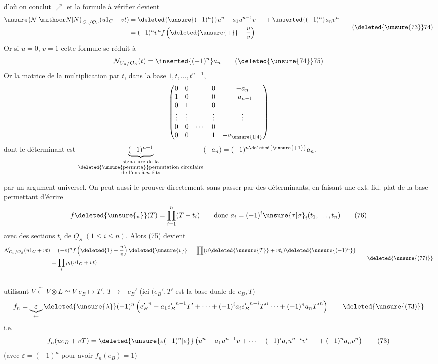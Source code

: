 d'où on conclut  $\nearrow$
et la formule à vérifier devient
\[
\begin{aligned}
\unsure{\mathcal N|\mathscr N|N}_{C_n/\mathcal O_S}(u1_C+vt)&=\deleted{\unsure{(-1)^n}}u^n-a_1u^{n-1}v\,\text{---}\,+\inserted{(-1)^n}a_nv^n\\
&=(-1)^nv^nf\left(\deleted{\unsure{+}}-\frac{u}{v}\right)
\end{aligned}\tag*{(\deleted{\unsure{73}}74)}
\]
Or si $u=0$, $v=1$ cette formule se réduit à
\[
 \mathcal N_{C_n/\mathcal O_S}(t)=\inserted{(-1)^n}a_n \tag*{(\deleted{\unsure{74}}75)}
\]
Or la matrice de la multiplication par $t$, dans
la base $1,t,\ldots,t^{n-1}$, 
\[
\begin{pmatrix}
0&0&&0&-a_n\\
1&0&&0&-a_{n-1}\\
0&1&&0&\\
\vdots&\vdots&&\vdots&\vdots\\
0&0&\cdots&0&\\
0&0&&1&-a_{\unsure{1|4}}
\end{pmatrix}
\]
dont le déterminant est $\underbrace{(-1)^{n+1}}_{\substack{\text{signature de la}\\\text{\deleted{\unsure{permuta}}permutation circulaire}\\\text{de l'ens à $n$ élts}}}(-a_n)=(-1)^{n\deleted{\unsure{+1}}}a_n$.

 
par un argument universel. On peut aussi le
prouver directement, sans passer par des
déterminants, en faisant une ext. fid. plat
de la base permettant d'écrire
\[
 f\deleted{\unsure{_n}}(T)=\prod_{i=1}^n(T-t_i)\qquad\text{donc }a_i=(-1)^i\unsure{\tau|\sigma}_i(t_1,\ldots,t_n) \tag*{(76)}
\]
avec des sections $t_i$ de $\underline O_S$ $(1\leq i\leq n)$. 
Alors (75) devient
\[
\begin{aligned}
\mathcal N_{C_n/\mathcal O_S}(u1_C+vt)&=(-v)^nf\left(\deleted{1}-\frac{u}{v}\right)\deleted{\unsure{v}}\;=\prod(u\deleted{\unsure{T}}+vt_i)\deleted{\unsure{(-1)^n}}\\
&=\prod_i \rho_i(u1_C+vt)
\end{aligned}\tag*{\deleted{\unsure{(77)}}}
\]

\noindent\rule{\linewidth}{0.3pt}

utilisant $\check V\xleftarrow{\sim} V\otimes L\simeq V$ \qquad $e_B\longmapsto T'$, $T\longrightarrow -e_B'$
(ici $(e_B',T'$ est la base duale de $e_B,T$)
\[
 f_n=\underbrace{\varepsilon}_{\leftarrow}\deleted{\unsure{\lambda}}(-1)^n\left({e_B'}^n-a_1{e_B'}^{n-1}T'+\cdots+(-1)^ia_i{e_B'}^{n-i}{T'}^i\cdots+(-1)^na_n{T'}^n\right) \tag*{\deleted{\unsure{(73)}}}
\]
i.e.
\[
 f_n(ue_B+vT)=\deleted{\unsure{\varepsilon(-1)^n|\varepsilon}}\left(u^n-a_1u^{n-1}v+\cdots+(-1)^ia_iu^{n-i}v^i\,\text{---}\,+(-1)^na_nv^n\right) \tag*{(73)}
\]
(avec $\varepsilon=(-1)^n$ pour avoir $f_n(e_B)=1$)

